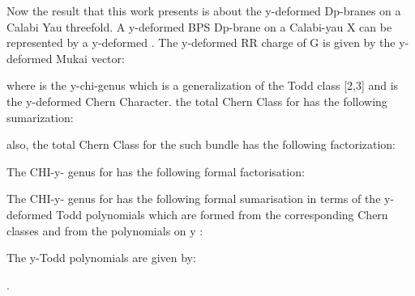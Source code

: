 \documentclass[a4paper,a4paper]{article}
\begin{document}
Now the result that this work presents is about the y-deformed Dp-branes on a Calabi Yau threefold. A y-deformed BPS Dp-brane on a Calabi-yau X can be represented by a y-deformed  \coordHE{}.  The y-deformed RR charge of G is given by the y-deformed Mukai vector:
\begin{center}
{  \coordHE{} }
\end{center}
where \coordHE{} is the y-chi-genus which is a generalization of the Todd class [2,3] and \coordHE{} is the y-deformed Chern Character. the total Chern Class for \coordHE{}  has the following sumarization:
\begin{center}
{  \coordHE{} }
\end{center} 
also, the total Chern Class for the such bundle has the following factorization:

\begin{center}
{  \coordHE{} }
\end{center}
The  CHI-y- genus for \coordHE{} has the following formal factorisation:
\begin{center}
{  \coordHE{} }
\end{center}

The CHI-y- genus for \coordHE{}  has the following formal sumarisation in terms of the y-deformed Todd polynomials which are formed from the corresponding Chern classes and from the polynomials on y :
\begin{center}
{  \coordHE{} }
\end{center}

The y-Todd  polynomials are given by:
\begin{center}
{  \coordHE{} }
\end{center}
\begin{center}
{  \coordHE{} }
\end{center}
\begin{center}
{  \coordHE{} }
\end{center}
\begin{center}
{  \coordHE{} }
\end{center}.
\end{document}
